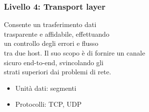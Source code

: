 \documentclass[aspectratio=169]{beamer}
\begin{document}
    \begin{frame}
        \frametitle{Livello 4: Transport layer}
        Consente un trasferimento dati\\trasparente e affidabile, effettuando\\un controllo degli errori e flusso\\tra due host.
        \vskip 0.3cm
        Il suo scopo è di fornire un canale\\sicuro end-to-end, svincolando gli\\strati superiori dai problemi di rete.

        \begin{itemize}
            \item Unità dati: segmenti
            \item Protocolli: TCP, UDP
        \end{itemize}
    \end{frame}
    
\end{document}
